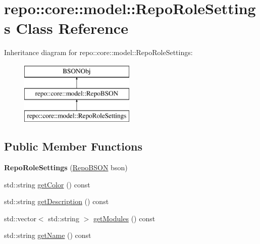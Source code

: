 \hypertarget{classrepo_1_1core_1_1model_1_1_repo_role_settings}{}\section{repo\+:\+:core\+:\+:model\+:\+:Repo\+Role\+Settings Class Reference}
\label{classrepo_1_1core_1_1model_1_1_repo_role_settings}
Inheritance diagram for repo\+:\+:core\+:\+:model\+:\+:Repo\+Role\+Settings\+:\begin{figure}[H]
\begin{center}
\leavevmode
\includegraphics[height=3.000000cm]{classrepo_1_1core_1_1model_1_1_repo_role_settings}
\end{center}
\end{figure}
\subsection*{Public Member Functions}
\begin{DoxyCompactItemize}
\item 
\hypertarget{classrepo_1_1core_1_1model_1_1_repo_role_settings_a544a98aad97a8dfa810c27d426e6d883}{}{\bfseries Repo\+Role\+Settings} (\hyperlink{classrepo_1_1core_1_1model_1_1_repo_b_s_o_n}{Repo\+B\+S\+O\+N} bson)\label{classrepo_1_1core_1_1model_1_1_repo_role_settings_a544a98aad97a8dfa810c27d426e6d883}

\item 
std\+::string \hyperlink{classrepo_1_1core_1_1model_1_1_repo_role_settings_ad9af14be4518a153fbfa69831c8aec46}{get\+Color} () const 
\item 
std\+::string \hyperlink{classrepo_1_1core_1_1model_1_1_repo_role_settings_a2349b21712bee3b32f8674d9d240e573}{get\+Description} () const 
\item 
std\+::vector$<$ std\+::string $>$ \hyperlink{classrepo_1_1core_1_1model_1_1_repo_role_settings_abed36f2c0e4e99ecef414ae1429b2657}{get\+Modules} () const 
\item 
std\+::string \hyperlink{classrepo_1_1core_1_1model_1_1_repo_role_settings_aad45aed668aaed32dc40c10a234f1524}{get\+Name} () const 
\end{DoxyCompactItemize}
